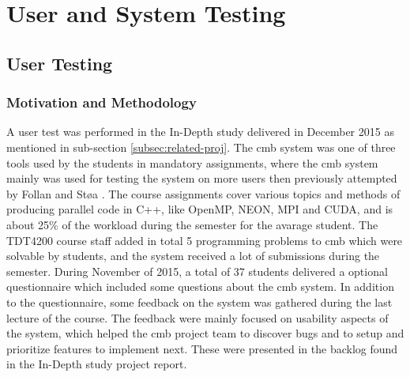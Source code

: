\chapter{User and System Testing}

\section{User Testing}

\subsection{Motivation and Methodology}
A user test was performed in the In-Depth study delivered in December 2015 as mentioned in sub-section \ref{subsec:related-proj}. The \gls{cmb} system was one of three tools used by the students in mandatory assignments, where the \gls{cmb} system mainly was used for testing the system on more users then previously attempted by Follan and Støa \cite{mt:T&S}. The course assignments cover various topics and methods of producing parallel code in C++, like OpenMP, NEON, MPI and CUDA, and is about 25\% of the workload during the semester for the avarage student. The TDT4200 course staff added in total 5 programming problems to \gls{cmb} which were solvable by students, and the system received a lot of submissions during the semester. During November of 2015, a total of 37 students delivered a optional questionnaire which included some questions about the \gls{cmb} system. In addition to the questionnaire, some feedback on the system was gathered during the last lecture of the course. The feedback were mainly focused on usability aspects of the system, which helped the \gls{cmb} project team to discover bugs and to setup and prioritize features to implement next. These were presented in the backlog found in the In-Depth study project report. \\

